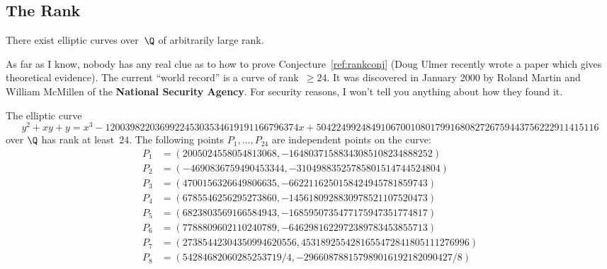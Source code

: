 \documentclass[11pt]{report}
\begin{document}
\subsection{The Rank}
\begin{conjecture}\label{ref:rankconj}
  There exist elliptic curves over~$\Q$ of arbitrarily large rank.
\end{conjecture}
As far as I know, nobody has any real clue as to how to prove
Conjecture~\ref{ref:rankconj} (Doug Ulmer recently wrote a paper
which gives theoretical evidence).
The current ``world record'' is a curve of rank~$\geq 24$.  It was discovered
in January 2000 by Roland Martin and William McMillen of the
  {\bf National Security Agency}.  For security reasons, I won't tell
you anything about how they found it.
\begin{theorem}
  The elliptic curve
    {\tiny
      $$
        y^2 + xy + y = x^3 - 120039822036992245303534619191166796374x
        + 504224992484910670010801799168082726759443756222911415116
      $$
    }over $\Q$ has rank at least~$24$. The following points
  $P_1,...,P_{24}$ are independent points on the curve:
  {\tiny
  \begin{align*}
    P_1    & = (2005024558054813068, -16480371588343085108234888252)                                                                           \\
    P_2    & = (-4690836759490453344, -31049883525785801514744524804)                                                                          \\
    P_3    & = (4700156326649806635, -6622116250158424945781859743)                                                                            \\
    P_4    & = (6785546256295273860, -1456180928830978521107520473)                                                                            \\
    P_5    & = (6823803569166584943, -1685950735477175947351774817)                                                                            \\
    P_6    & = (7788809602110240789, -6462981622972389783453855713)                                                                            \\
    P_7    & = (27385442304350994620556, 4531892554281655472841805111276996)                                                                   \\
    P_8    & = (54284682060285253719/4, -296608788157989016192182090427/8)                                                                     \\

\end{align*}}
\end{theorem}
\end{document}
